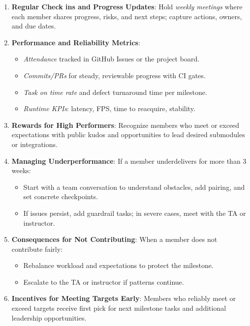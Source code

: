 \documentclass{article}
\begin{document}
\begin{enumerate}
  \item \textbf{Regular Check ins and Progress Updates}: Hold \textit{weekly
          meetings} where each member shares progress, risks, and next steps; capture
        actions, owners, and due dates.
  \item \textbf{Performance and Reliability Metrics}:
        \begin{itemize}
          \item \textit{Attendance} tracked in GitHub Issues or the project board.
          \item \textit{Commits/PRs} for steady, reviewable progress with CI gates.
          \item \textit{Task on time rate} and defect turnaround time per milestone.
          \item \textit{Runtime KPIs}: latency, FPS, time to reacquire, stability.
        \end{itemize}
  \item \textbf{Rewards for High Performers}: Recognize members who meet or
        exceed expectations with public kudos and opportunities to lead desired
        submodules or integrations.
  \item \textbf{Managing Underperformance}: If a member underdelivers for more
        than 3 weeks:
        \begin{itemize}
          \item Start with a team conversation to understand obstacles, add pairing, and set
                concrete checkpoints.
          \item If issues persist, add guardrail tasks; in severe cases, meet with the TA or
                instructor.
        \end{itemize}
  \item \textbf{Consequences for Not Contributing}: When a member does not
        contribute fairly:
        \begin{itemize}
          \item Rebalance workload and expectations to protect the milestone.
          \item Escalate to the TA or instructor if patterns continue.
        \end{itemize}
  \item \textbf{Incentives for Meeting Targets Early}: Members who reliably
        meet or exceed targets receive first pick for next milestone tasks and
        additional leadership opportunities.
\end{enumerate}
\end{document}
